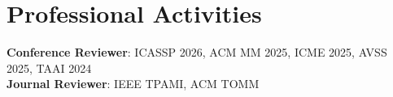\section{\textbf{Professional Activities}}
 \begin{itemize}[leftmargin=0in, label={}]
    \small{\item{
     \textbf{Conference Reviewer}{: ICASSP 2026, ACM MM 2025, ICME 2025, AVSS 2025, TAAI 2024} \\
     \textbf{Journal Reviewer}{: IEEE TPAMI, ACM TOMM} \\
    }}
 \end{itemize}
 \vspace{-16pt}
